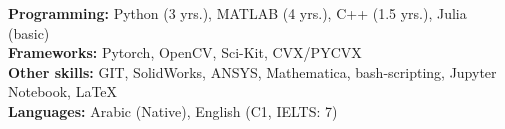 \textbf{Programming:} Python (3 yrs.), MATLAB (4 yrs.), C++ (1.5 yrs.), Julia (basic)\\
\textbf{Frameworks:} Pytorch, OpenCV, Sci-Kit, CVX/PYCVX\\
\textbf{Other skills:} GIT, SolidWorks, ANSYS, Mathematica, bash-scripting, Jupyter Notebook, LaTeX\\
\textbf{Languages:} Arabic (Native), English (C1, IELTS: 7)